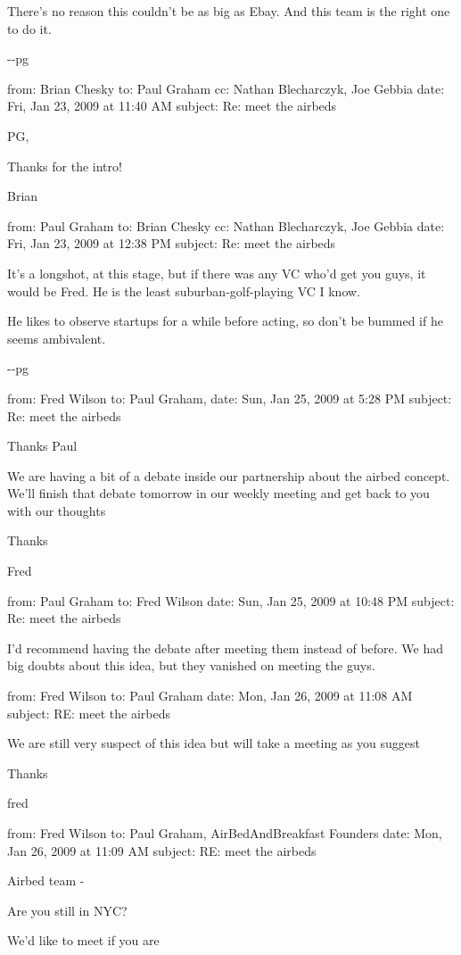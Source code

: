 \documentclass[12pt]{book}
\begin{document}
There's no reason this couldn't be as big as Ebay. And this team is the
right one to do it.

-\/-pg

from: Brian Chesky to: Paul Graham cc: Nathan Blecharczyk, Joe Gebbia
date: Fri, Jan 23, 2009 at 11:40 AM subject: Re: meet the airbeds

PG,

Thanks for the intro!

Brian

from: Paul Graham to: Brian Chesky cc: Nathan Blecharczyk, Joe Gebbia
date: Fri, Jan 23, 2009 at 12:38 PM subject: Re: meet the airbeds

It's a longshot, at this stage, but if there was any VC who'd get you
guys, it would be Fred. He is the least suburban-golf-playing VC I know.

He likes to observe startups for a while before acting, so don't be
bummed if he seems ambivalent.

-\/-pg

from: Fred Wilson to: Paul Graham, date: Sun, Jan 25, 2009 at 5:28 PM
subject: Re: meet the airbeds

Thanks Paul

We are having a bit of a debate inside our partnership about the airbed
concept. We'll finish that debate tomorrow in our weekly meeting and get
back to you with our thoughts

Thanks

Fred

from: Paul Graham to: Fred Wilson date: Sun, Jan 25, 2009 at 10:48 PM
subject: Re: meet the airbeds

I'd recommend having the debate after meeting them instead of before. We
had big doubts about this idea, but they vanished on meeting the guys.

from: Fred Wilson to: Paul Graham date: Mon, Jan 26, 2009 at 11:08 AM
subject: RE: meet the airbeds

We are still very suspect of this idea but will take a meeting as you
suggest

Thanks

fred

from: Fred Wilson to: Paul Graham, AirBedAndBreakfast Founders date:
Mon, Jan 26, 2009 at 11:09 AM subject: RE: meet the airbeds

Airbed team -

Are you still in NYC?

We'd like to meet if you are
\end{document}
